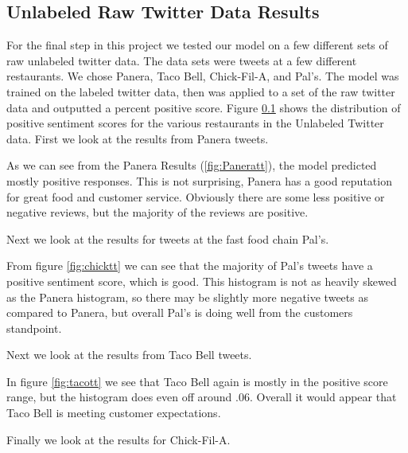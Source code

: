 \documentclass[titlepage,letterpaper]{article}
\begin{document}


\subsection{Unlabeled Raw Twitter Data Results}


\label{twitmeg}

For the final step in this project we tested our model on a few different sets of raw unlabeled twitter data. The data sets were tweets at a few different restaurants. We chose Panera, Taco Bell, Chick-Fil-A, and Pal's. The model was trained on the labeled twitter data, then was applied to a set of the raw twitter data and outputted a percent positive score. Figure \ref{twitmeg} shows the distribution of positive sentiment scores for the various restaurants in the Unlabeled Twitter data. First we look at the results from Panera tweets. 


As we can see from the Panera Results (\cref{fig:Paneratt}), the model predicted mostly positive responses. This is not surprising, Panera has a good reputation for great food and customer service. Obviously there are some less positive or negative reviews, but the majority of the reviews are positive.

Next we look at the results for tweets at the fast food chain Pal's.



From figure \cref{fig:chicktt} we can see that the majority of Pal's tweets have a positive sentiment score, which is good. This histogram is not as heavily skewed as the Panera histogram, so there may be slightly more negative tweets as compared to Panera, but overall Pal's is doing well from the customers standpoint. 

Next we look at the results from Taco Bell tweets.



In figure \cref{fig:tacott} we see that Taco Bell again is mostly in the positive score range, but the histogram does even off around $.06$. Overall it would appear that Taco Bell is meeting customer expectations. 

Finally we look at the results for Chick-Fil-A.


%
\end{document}
